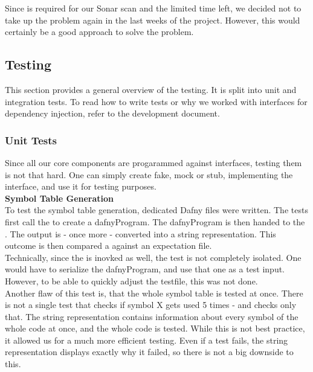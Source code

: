 Since  is required for our Sonar scan and the limited time left,
we decided not to take up the problem again in the last weeks of the project.
However, this would certainly be a good approach to solve the problem.

\subsection{Testing}

This section provides a general overview of the testing.
It is split into unit and integration tests.
To read how to write tests or why we worked with interfaces for dependency injection, refer to the development document.

\subsubsection{Unit Tests}
Since all our core components are progarammed against interfaces, testing them is not that hard.
One can simply create fake, mock or stub, implementing the interface, and use it for testing purposes.\\

\textbf{Symbol Table Generation}\\
To test the symbol table generation, dedicated Dafny files were written.
The tests first call the  to create a dafnyProgram.
The dafnyProgram is then handed to the .
The output is - once more - converted into a string representation.
This outcome is then compared a against an expectation file.\\

Technically, since the  is inovked as well, the test is not completely isolated.
One would have to serialize the dafnyProgram, and use that one as a test input.
However, to be able to quickly adjust the testfile, this was not done.\\

Another flaw of this test is, that the whole symbol table is tested at once.
There is not a single test that checks if symbol X gets used 5 times - and checks only that.
The string representation contains information about every symbol of the whole code at once, and the whole code is tested.
While this is not best practice, it allowed us for a much more efficient testing.
Even if a test fails, the string representation displays exactly why it failed, so there is not a big downside to this.\\

